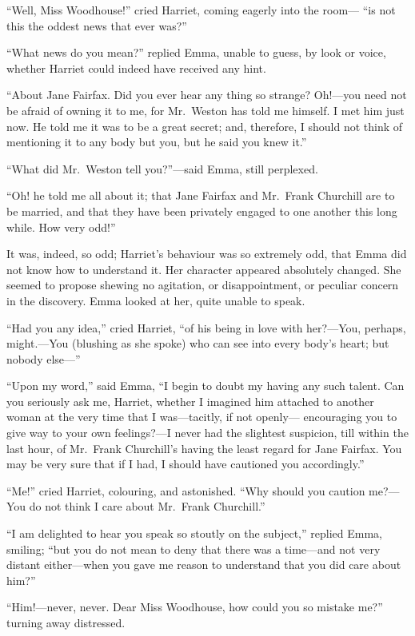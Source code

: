 ``Well, Miss Woodhouse!'' cried Harriet, coming eagerly into the room---%
``is not this the oddest news that ever was?''

``What news do you mean?'' replied Emma, unable to guess, by look
or voice, whether Harriet could indeed have received any hint.

``About Jane Fairfax.  Did you ever hear any thing so strange?
Oh!---you need not be afraid of owning it to me, for Mr.\ Weston has
told me himself.  I met him just now.  He told me it was to be
a great secret; and, therefore, I should not think of mentioning
it to any body but you, but he said you knew it.''

``What did Mr.\ Weston tell you?''---said Emma, still perplexed.

``Oh! he told me all about it; that Jane Fairfax and Mr.\ Frank
Churchill are to be married, and that they have been privately
engaged to one another this long while.  How very odd!''

It was, indeed, so odd; Harriet's behaviour was so extremely odd,
that Emma did not know how to understand it.  Her character appeared
absolutely changed.  She seemed to propose shewing no agitation,
or disappointment, or peculiar concern in the discovery.  Emma looked
at her, quite unable to speak.

``Had you any idea,'' cried Harriet, ``of his being in love
with her?---You, perhaps, might.---You (blushing as she spoke)
who can see into every body's heart; but nobody else---''

``Upon my word,'' said Emma, ``I begin to doubt my having any such talent.
Can you seriously ask me, Harriet, whether I imagined him attached
to another woman at the very time that I was---tacitly, if not openly---%
encouraging you to give way to your own feelings?---I never had
the slightest suspicion, till within the last hour, of Mr.\ Frank
Churchill's having the least regard for Jane Fairfax.  You may be
very sure that if I had, I should have cautioned you accordingly.''

``Me!'' cried Harriet, colouring, and astonished.  ``Why should you
caution me?---You do not think I care about Mr.\ Frank Churchill.''

``I am delighted to hear you speak so stoutly on the subject,''
replied Emma, smiling; ``but you do not mean to deny that there
was a time---and not very distant either---when you gave me reason
to understand that you did care about him?''

``Him!---never, never.  Dear Miss Woodhouse, how could you so mistake me?''
turning away distressed.

